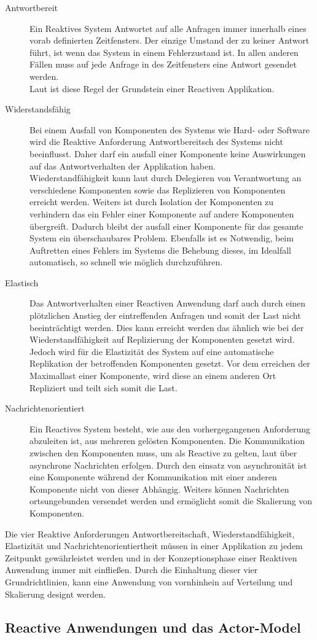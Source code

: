 \begin{description}
    \item[Antwortbereit]\label{reactivo:responsive}
    Ein Reaktives System Antwortet auf alle Anfragen immer innerhalb eines vorab definierten Zeitfensters. Der einzige Umstand der zu keiner Antwort führt, ist wenn das System in einem Fehlerzustand ist. In allen anderen Fällen muss auf jede Anfrage in des Zeitfensters eine Antwort gesendet werden.\\
    Laut \cite{reactiveManifesto} ist diese Regel der Grundstein einer {Reactiven} Applikation.
    \item[Widerstandsfähig]\label{reactivo:resilient}
    Bei einem Ausfall von Komponenten des Systems wie Hard- oder Software wird die Reaktive Anforderung {Antwortbereitsch} des Systems nicht beeinflusst. Daher darf ein ausfall einer Komponente keine Auswirkungen auf das Antwortverhalten der Applikation haben.\\
    Wiederstandfähigkeit kann laut \cite{reactiveManifesto} durch Delegieren von Verantwortung an verschiedene Komponenten sowie das Replizieren von Komponenten erreicht werden. Weiters ist durch Isolation der Komponenten zu verhindern das ein Fehler einer Komponente auf andere Komponenten übergreift. Dadurch bleibt der ausfall einer Komponente für das gesamte System ein überschaubares Problem. Ebenfalls ist es Notwendig, beim Auftretten eines Fehlers im Systems die Behebung dieses, im Idealfall automatisch, so schnell wie möglich durchzuführen.
    \item[Elastisch]\label{reactivo:elastic}
    Das Antwortverhalten einer Reactiven Anwendung darf auch durch einen plötzlichen Anstieg der eintreffenden Anfragen und somit der Last nicht beeinträchtigt werden. Dies kann erreicht werden das ähnlich wie bei der Wiederstandfähigkeit auf Replizierung der Komponenten gesetzt wird. Jedoch wird für die Elastizität des System auf eine automatische Replikation der betroffenden Komponenten gesetzt. Vor dem erreichen der Maximallast einer Komponente, wird diese an einem anderen Ort Repliziert und teilt sich somit die Last. 
    \item[Nachrichtenorientiert]\label{reactivo:messageDriven}
    Ein Reactives System besteht, wie aus den vorhergegangenen Anforderung abzuleiten ist, aus mehreren gelösten Komponenten. Die Kommunikation zwischen den Komponenten muss, um als Reactive zu gelten, laut \cite{reactiveManifesto}  über asynchrone Nachrichten erfolgen. Durch den einsatz von asynchronität ist eine Komponente während der Kommunikation mit einer anderen Komponente nicht von dieser Abhängig. Weiters können Nachrichten ortsungebunden versendet werden und ermöglicht somit die Skalierung von Komponenten. 
\end{description} 
Die vier {Reaktive} Anforderungen Antwortbereitschaft, Wiederstandfähigkeit, Elastizität und Nachrichtenorientiertheit müssen in einer Applikation zu jedem Zeitpunkt gewährleistet werden und in der Konzeptionsphase einer Reaktiven Anwendung immer mit einfließen. Durch die Einhaltung dieser vier Grundrichtlinien, kann eine Anwendung von vornhinhein auf Verteilung und Skalierung designt werden.

\subsection{Reactive Anwendungen und das Actor-Model}

